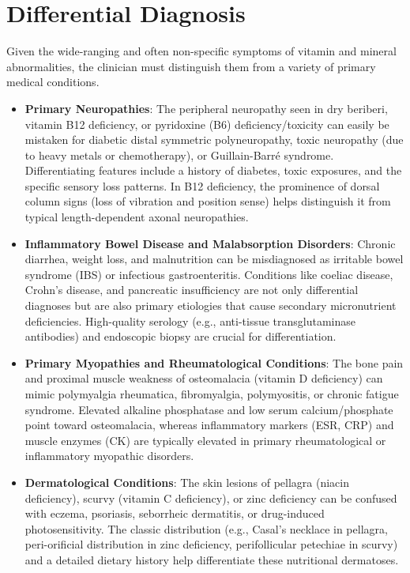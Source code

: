 \section*{Differential Diagnosis}
Given the wide-ranging and often non-specific symptoms of vitamin and mineral abnormalities, the clinician must distinguish them from a variety of primary medical conditions.
\begin{itemize}
\item \textbf{Primary Neuropathies}: The peripheral neuropathy seen in dry beriberi, vitamin B12 deficiency, or pyridoxine (B6) deficiency/toxicity can easily be mistaken for diabetic distal symmetric polyneuropathy, toxic neuropathy (due to heavy metals or chemotherapy), or Guillain-Barr\'e syndrome. Differentiating features include a history of diabetes, toxic exposures, and the specific sensory loss patterns. In B12 deficiency, the prominence of dorsal column signs (loss of vibration and position sense) helps distinguish it from typical length-dependent axonal neuropathies.
\item \textbf{Inflammatory Bowel Disease and Malabsorption Disorders}: Chronic diarrhea, weight loss, and malnutrition can be misdiagnosed as irritable bowel syndrome (IBS) or infectious gastroenteritis. Conditions like coeliac disease, Crohn's disease, and pancreatic insufficiency are not only differential diagnoses but are also primary etiologies that cause secondary micronutrient deficiencies. High-quality serology (e.g., anti-tissue transglutaminase antibodies) and endoscopic biopsy are crucial for differentiation.
\item \textbf{Primary Myopathies and Rheumatological Conditions}: The bone pain and proximal muscle weakness of osteomalacia (vitamin D deficiency) can mimic polymyalgia rheumatica, fibromyalgia, polymyositis, or chronic fatigue syndrome. Elevated alkaline phosphatase and low serum calcium/phosphate point toward osteomalacia, whereas inflammatory markers (ESR, CRP) and muscle enzymes (CK) are typically elevated in primary rheumatological or inflammatory myopathic disorders.
\item \textbf{Dermatological Conditions}: The skin lesions of pellagra (niacin deficiency), scurvy (vitamin C deficiency), or zinc deficiency can be confused with eczema, psoriasis, seborrheic dermatitis, or drug-induced photosensitivity. The classic distribution (e.g., Casal's necklace in pellagra, peri-orificial distribution in zinc deficiency, perifollicular petechiae in scurvy) and a detailed dietary history help differentiate these nutritional dermatoses.

\end{itemize}
